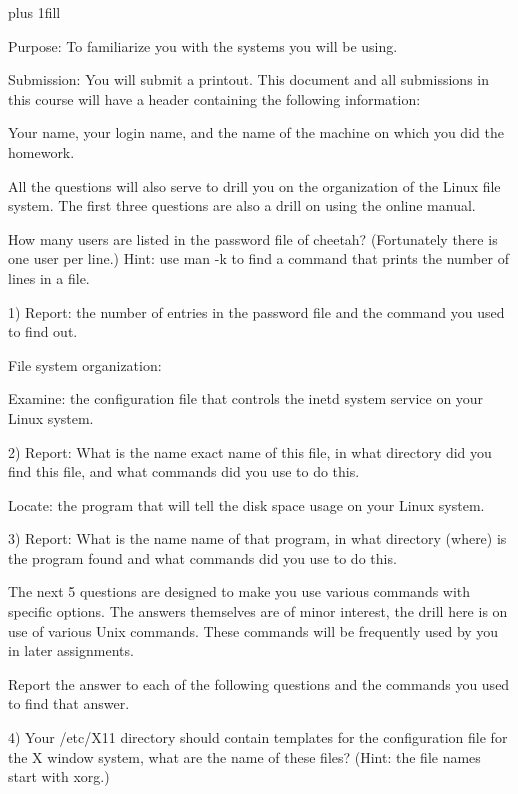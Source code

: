
\rightskip=0pt plus 1fill

\parindent 0pt

Purpose:
To familiarize you with the systems you will be using.

Submission: You will submit a printout.
This document and all submissions in this course will have a header
containing the following information:

Your name, your login name, and the name of the machine on which you
did the homework.

All the questions will also serve to drill you on the organization
of the Linux file system.
The first three questions are also a drill on using the online manual.

How many users are listed in the password file of cheetah?
(Fortunately there is one user per line.)
Hint: use {\ltt{}man -k} to find a command that prints the number
of lines in a file.

1) Report: the number of entries in the password file and
the command you used to find out.

File system organization:

Examine: the configuration file that controls the {\ltt{}inetd} system service
on your Linux system.

2) Report: 
What is the name exact name of this file,
in what directory did you find this file,
and what commands did you use to do this.

Locate: the program that will tell the disk space usage
on your Linux system.

3) Report: What is the name name of that program,
in what directory (where) is the program found
and what commands did you use to do this.

The next 5 questions are designed to make you use various
commands with specific options.
The answers themselves are of minor interest, the drill here is
on use of various Unix commands.
These commands will be frequently used by you in later assignments.

Report the answer to each of the following questions and the
commands you used to find that answer.

4) Your {\ltt{}/etc/X11} directory should contain templates for
the configuration file for the {\ltt{}X} window system,
what are the name of these files?
(Hint: the file names start with xorg.)

